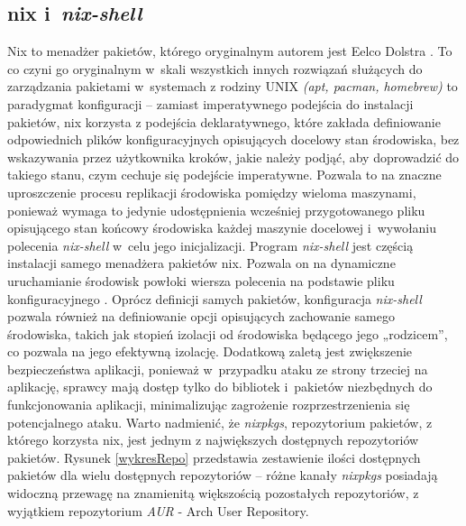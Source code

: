 \subsection{nix i~\textit{nix-shell}}
Nix to menadżer pakietów, którego oryginalnym autorem jest Eelco Dolstra \cite{nix-repo}. To co czyni go oryginalnym w~skali wszystkich innych rozwiązań służących do zarządzania pakietami w~systemach z rodziny UNIX \textit{(apt, pacman, homebrew)} to paradygmat konfiguracji -- zamiast imperatywnego podejścia do instalacji pakietów, nix korzysta z podejścia deklaratywnego, które zakłada definiowanie odpowiednich plików konfiguracyjnych opisujących docelowy stan środowiska, bez wskazywania przez użytkownika kroków, jakie należy podjąć, aby doprowadzić do takiego stanu, czym cechuje się podejście imperatywne. Pozwala to na znaczne uproszczenie procesu replikacji środowiska pomiędzy wieloma maszynami, ponieważ wymaga to jedynie udostępnienia wcześniej przygotowanego pliku opisującego stan końcowy środowiska każdej maszynie docelowej i~wywołaniu polecenia \textit{nix-shell} w~celu jego inicjalizacji. 
\newline \noindent Program \textit{nix-shell} jest częścią instalacji samego menadżera pakietów nix. Pozwala on na dynamiczne uruchamianie środowisk powłoki wiersza polecenia na podstawie pliku konfiguracyjnego \cite{nix-shell}. Oprócz definicji samych pakietów, konfiguracja \textit{nix-shell} pozwala również na definiowanie opcji opisujących zachowanie samego środowiska, takich jak stopień izolacji od środowiska będącego jego „rodzicem”, co pozwala na jego efektywną izolację. Dodatkową zaletą jest zwiększenie bezpieczeństwa aplikacji, ponieważ w~przypadku ataku ze strony trzeciej na aplikację, sprawcy mają dostęp tylko do bibliotek i~pakietów niezbędnych do funkcjonowania aplikacji, minimalizując zagrożenie rozprzestrzenienia się potencjalnego ataku.
\newline \noindent Warto nadmienić, że \textit{nixpkgs}, repozytorium pakietów, z którego korzysta nix, jest jednym z największych dostępnych repozytoriów pakietów. Rysunek \ref{wykresRepo} przedstawia zestawienie ilości dostępnych pakietów dla wielu dostępnych repozytoriów -- różne kanały \textit{nixpkgs} posiadają widoczną przewagę na znamienitą większością pozostałych repozytoriów, z wyjątkiem repozytorium \textit{AUR} - Arch User Repository.

